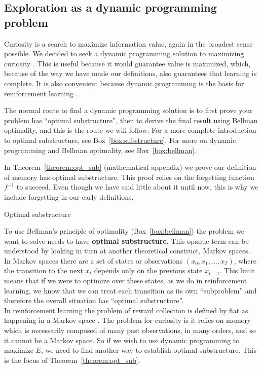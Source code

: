\subsection{Exploration as a dynamic programming problem}
Curiosity is a search to maximize information value, again in the broadest sense possible. We decided to seek a dynamic programming solution to maximizing curiosity \citep{Bellmann1954}. This is useful because it would guarantee value is maximized, which, because of the way we have made our definitions, also guarantees that learning is complete. It is also convenient because dynamic programming is the basis for reinforcement learning \citep{Sutton2018}. 

The normal route to find a dynamic programming solution is to first prove your problem has ``optimal substructure'', then to derive the final result using Bellman optimality, and this is the route we will follow. For a more complete introduction to optimal substructure, see Box~\ref{box:substructure}. For more on dynamic programming and Bellman optimality, see Box~\ref{box:bellman}. 

In Theorem~\ref{theorem:opt_sub} (mathematical appendix) we prove our definition of memory has optimal substructure. This proof relies on the forgetting function $f^{-1}$ to succeed. Even though we have said little about it until now, this is why we include forgetting in our early definitions. 

\begin{featurebox}
	\caption{Optimal substructure}
	\label{box:substructure}
	To use Bellman's principle of optimality (Box~\ref{box:bellman}) the problem we want to solve needs to have \textbf{optimal substructure}. This opaque term can be understood by looking in turn at another theoretical construct, Markov spaces. 
	\\
	In Markov spaces there are a set of states or observations $(x_0, x_1, ..., x_{T})$, where the transition to the next $x_t$ depends only on the previous state $x_{t-1}$. This limit means that if we were to optimize over these states, as we do in reinforcement learning, we know that we can treat each transition as its own ``subproblem'' and therefore the overall situation has ``optimal substructure''.
	\\
	In reinforcement learning the problem of reward collection is defined by fiat as happening in a Markov space \citep{Sutton2018}. The problem for curiosity is it relies on memory which is necessarily composed of many past observations, in many orders, and so it cannot be a Markov space. So if we wish to use dynamic programming to maximize $E$, we need to find another way to establish optimal substructure. This is the focus of Theorem~\ref{theorem:opt_sub}.
	\medskip
\end{featurebox}


